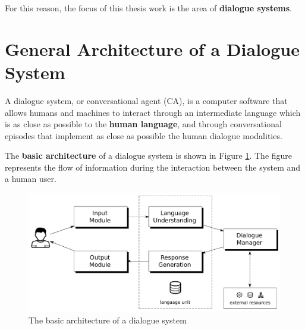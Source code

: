 For this reason, the focus of this thesis work is the area of \textbf{dialogue systems}.


\section{General Architecture of a Dialogue System}
A dialogue system, or conversational agent (CA), is a computer software that allows humans and machines to interact through an intermediate language which is as close as possible to the \textbf{human language}, and through conversational episodes that implement as close as possible the human dialogue modalities.

The \textbf{basic architecture} of a dialogue system is shown in Figure \ref{ds_arch}. The figure represents the flow of information during the interaction between the system and a human user.

\begin{figure}
	\centering
	\includegraphics[width=15cm]{Pictures/ds_arch.pdf}
	\caption{The basic architecture of a dialogue system}
	\label{ds_arch}
\end{figure}
 
